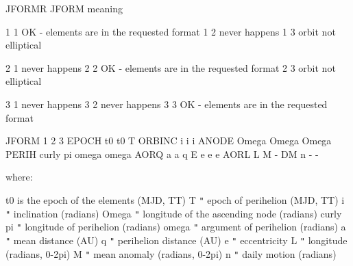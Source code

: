 \documentclass[twoside,11pt,nolof]{starlink}
\begin{document}
{{{      }
         JFORMR   JFORM     meaning

           1        1       OK - elements are in the requested format
           1        2       never happens
           1        3       orbit not elliptical

           2        1       never happens
           2        2       OK - elements are in the requested format
           2        3       orbit not elliptical

           3        1       never happens
           3        2       never happens
           3        3       OK - elements are in the requested format

          JFORM         1              2              3
          EPOCH         t0             t0             T
          ORBINC        i              i              i
          ANODE         Omega          Omega          Omega
          PERIH         curly pi       omega          omega
          AORQ          a              a              q
          E             e              e              e
          AORL          L              M              -
          DM            n              -              -

        where:

          t0           is the epoch of the elements (MJD, TT)
          T              \texttt{"}     epoch of perihelion (MJD, TT)
          i              \texttt{"}     inclination (radians)
          Omega          \texttt{"}     longitude of the ascending node (radians)
          curly pi       \texttt{"}     longitude of perihelion (radians)
          omega          \texttt{"}     argument of perihelion (radians)
          a              \texttt{"}     mean distance (AU)
          q              \texttt{"}     perihelion distance (AU)
          e              \texttt{"}     eccentricity
          L              \texttt{"}     longitude (radians, 0-2pi)
          M              \texttt{"}     mean anomaly (radians, 0-2pi)
          n              \texttt{"}     daily motion (radians)
      }}
\end{document}
